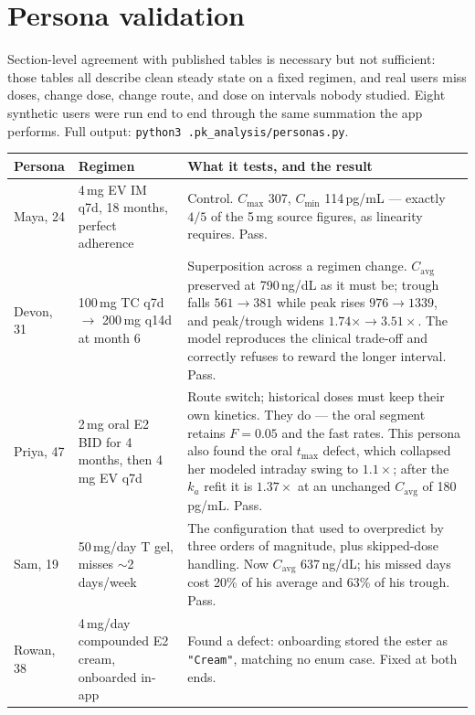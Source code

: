 \documentclass[11pt,a4paper]{article}
\newcommand{\good}[1]{#1}
\newcommand{\code}[1]{\texttt{\small #1}}
\begin{document}
\section{Persona validation}

Section-level agreement with published tables is necessary but not sufficient:
those tables all describe clean steady state on a fixed regimen, and real users
miss doses, change dose, change route, and dose on intervals nobody studied.
Eight synthetic users were run end to end through the same summation the app
performs. Full output: \code{python3 .pk\_analysis/personas.py}.

\begin{longtable}{@{}p{2.6cm}p{4.5cm}p{7.4cm}@{}}
\toprule
\textbf{Persona} & \textbf{Regimen} & \textbf{What it tests, and the result} \\
\midrule
\endhead
Maya, 24 & 4\,mg EV IM q7d, 18 months, perfect adherence
 & Control. $C_{\max}$ 307, $C_{\min}$ 114\,pg/mL --- exactly $4/5$ of the 5\,mg
   source figures, as linearity requires. \good{Pass.} \\[0.4em]
Devon, 31 & 100\,mg TC q7d $\to$ 200\,mg q14d at month 6
 & Superposition across a regimen change. $C_{\mathrm{avg}}$ preserved at
   790\,ng/dL as it must be; trough falls $561 \to 381$ while peak rises
   $976 \to 1339$, and peak/trough widens $1.74\times \to 3.51\times$. The model
   reproduces the clinical trade-off and correctly refuses to reward the longer
   interval. \good{Pass.} \\[0.4em]
Priya, 47 & 2\,mg oral E2 BID for 4 months, then 4\,mg EV q7d
 & Route switch; historical doses must keep their own kinetics. They do --- the
   oral segment retains $F = 0.05$ and the fast rates. This persona also found the
   oral $t_{\max}$ defect, which collapsed her modeled intraday swing to
   $1.1\times$; after the $k_a$ refit it is $1.37\times$ at an unchanged
   $C_{\mathrm{avg}}$ of 180\,pg/mL. \good{Pass.} \\[0.4em]
Sam, 19 & 50\,mg/day T gel, misses $\sim$2 days/week
 & The configuration that used to overpredict by three orders of magnitude, plus
   skipped-dose handling. Now $C_{\mathrm{avg}}$ 637\,ng/dL; his missed days cost
   20\% of his average and 63\% of his trough. \good{Pass.} \\[0.4em]
Rowan, 38 & 4\,mg/day compounded E2 cream, onboarded in-app
 & Found a defect: onboarding stored the ester as \code{"Cream"}, matching no
   enum case. \good{Fixed at both ends.} \\[0.4em]

\end{longtable}
\end{document}
